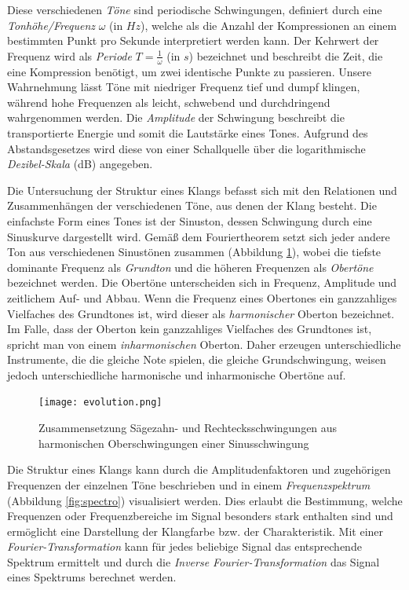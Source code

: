 \documentclass[
  a4paper,  %
  twoside,  %
  bibliography=totoc,
  headsepline,
  cleardoublepage=empty,
  parskip=half,
  draft=false
]{scrbook}
\begin{document}
Diese verschiedenen \emph{Töne} sind periodische Schwingungen, definiert durch eine \emph{Tonhöhe/Frequenz} $\omega$ (in $Hz$), welche als die Anzahl der Kompressionen an einem bestimmten Punkt pro Sekunde interpretiert werden kann. Der Kehrwert der Frequenz wird als \emph{Periode} $T=\frac{1}{\omega}$ (in $s$) bezeichnet und beschreibt die Zeit, die eine Kompression benötigt, um zwei identische Punkte zu passieren. Unsere Wahrnehmung lässt Töne mit niedriger Frequenz tief und dumpf klingen, während hohe Frequenzen als leicht, schwebend und durchdringend wahrgenommen werden. Die \emph{Amplitude} der Schwingung beschreibt die transportierte Energie und somit die Lautstärke eines Tones. Aufgrund des Abstandsgesetzes wird diese von einer Schallquelle über die logarithmische \emph{Dezibel-Skala} (dB) angegeben.  \cite{tsuji_physics_2021, parker_good_2009}

Die Untersuchung der Struktur eines Klangs befasst sich mit den Relationen und Zusammenhängen der verschiedenen Töne, aus denen der Klang besteht. Die einfachste Form eines Tones ist der Sinuston, dessen Schwingung durch eine Sinuskurve dargestellt wird. Gemäß dem Fouriertheorem setzt sich jeder andere Ton aus verschiedenen Sinustönen zusammen (Abbildung \ref{fig:evolution}), wobei die tiefste dominante Frequenz als \emph{Grundton} und die höheren Frequenzen als \emph{Obertöne} bezeichnet werden. Die Obertöne unterscheiden sich in Frequenz, Amplitude und zeitlichem Auf- und Abbau. Wenn die Frequenz eines Obertones ein ganzzahliges Vielfaches des Grundtones ist, wird dieser als \emph{harmonischer} Oberton bezeichnet. Im Falle, dass der Oberton kein ganzzahliges Vielfaches des Grundtones ist, spricht man von einem \emph{inharmonischen} Oberton. Daher erzeugen unterschiedliche Instrumente, die die gleiche Note spielen, die gleiche Grundschwingung, weisen jedoch unterschiedliche harmonische und inharmonische Obertöne auf. \cite{parker_good_2009, white_physics_2014, ruschkowski_elektronische_2019}

\begin{figure}
  \centering
  \texttt{[image: evolution.png]}
  \caption[Fourier Reihe]{Zusammensetzung Sägezahn- und Rechtecksschwingungen aus harmonischen Oberschwingungen einer Sinusschwingung}
  \label{fig:evolution}
\end{figure}

Die Struktur eines Klangs kann durch die Amplitudenfaktoren und zugehörigen Frequenzen der einzelnen Töne beschrieben und in einem \emph{Frequenzspektrum} (Abbildung \ref{fig:spectro}) visualisiert werden. Dies erlaubt die Bestimmung, welche Frequenzen oder Frequenzbereiche im Signal besonders stark enthalten sind und ermöglicht eine Darstellung der Klangfarbe bzw. der Charakteristik. Mit einer \emph{Fourier-Transformation} kann für jedes beliebige Signal das entsprechende Spektrum ermittelt und durch die \emph{Inverse Fourier-Transformation} das Signal eines Spektrums berechnet werden. \cite{raffaseder_audiodesign_2010}
\end{document}
